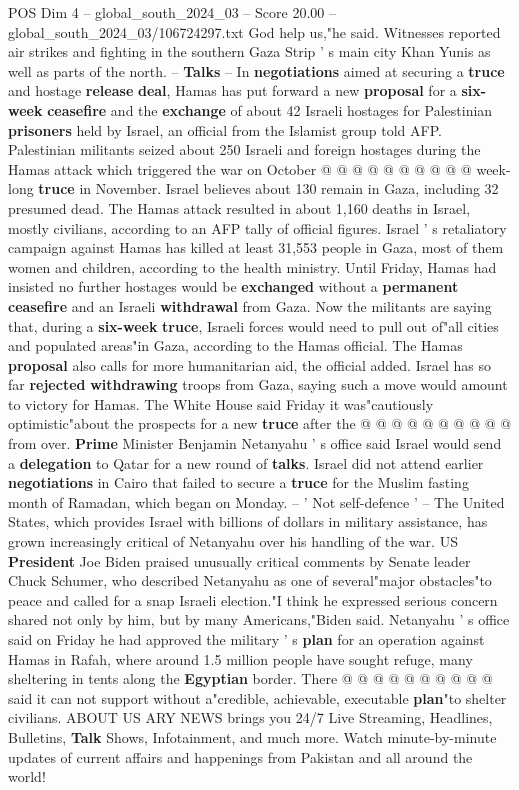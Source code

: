 \begin{textsample}{POS Dim 4 – global\_south\_2024\_03 – Score 20.00 – global\_south\_2024\_03/106724297.txt}
God help us,"he said.
Witnesses reported air strikes and fighting in the southern Gaza Strip ' s main city Khan Yunis as well as parts of the north. -- \textbf{Talks} -- In \textbf{negotiations} aimed at securing a \textbf{truce} and hostage \textbf{release} \textbf{deal}, Hamas has put forward a new \textbf{proposal} for a \textbf{six-week} \textbf{ceasefire} and the \textbf{exchange} of about 42 Israeli hostages for Palestinian \textbf{prisoners} held by Israel, an official from the Islamist group told AFP.
Palestinian militants seized about 250 Israeli and foreign hostages during the Hamas attack which triggered the war on October @ @ @ @ @ @ @ @ @ @ week-long \textbf{truce} in November.
Israel believes about 130 remain in Gaza, including 32 presumed dead.
The Hamas attack resulted in about 1,160 deaths in Israel, mostly civilians, according to an AFP tally of official figures.
Israel ' s retaliatory campaign against Hamas has killed at least 31,553 people in Gaza, most of them women and children, according to the health ministry.
Until Friday, Hamas had insisted no further hostages would be \textbf{exchanged} without a \textbf{permanent} \textbf{ceasefire} and an Israeli \textbf{withdrawal} from Gaza.
Now the militants are saying that, during a \textbf{six-week} \textbf{truce}, Israeli forces would need to pull out of"all cities and populated areas"in Gaza, according to the Hamas official.
The Hamas \textbf{proposal} also calls for more humanitarian aid, the official added.
Israel has so far \textbf{rejected} \textbf{withdrawing} troops from Gaza, saying such a move would amount to victory for Hamas.
The White House said Friday it was"cautiously optimistic"about the prospects for a new \textbf{truce} after the @ @ @ @ @ @ @ @ @ @ from over. \textbf{Prime} Minister Benjamin Netanyahu ' s office said Israel would send a \textbf{delegation} to Qatar for a new round of \textbf{talks}.
Israel did not attend earlier \textbf{negotiations} in Cairo that failed to secure a \textbf{truce} for the Muslim fasting month of Ramadan, which began on Monday. -- ' Not self-defence ' -- The United States, which provides Israel with billions of dollars in military assistance, has grown increasingly critical of Netanyahu over his handling of the war.
US \textbf{President} Joe Biden praised unusually critical comments by Senate leader Chuck Schumer, who described Netanyahu as one of several"major obstacles"to peace and called for a snap Israeli election."I think he expressed serious concern shared not only by him, but by many Americans,"Biden said.
Netanyahu ' s office said on Friday he had approved the military ' s \textbf{plan} for an operation against Hamas in Rafah, where around 1.5 million people have sought refuge, many sheltering in tents along the \textbf{Egyptian} border.
There @ @ @ @ @ @ @ @ @ @ said it can not support without a"credible, achievable, executable \textbf{plan}"to shelter civilians.
ABOUT US ARY NEWS brings you 24/7 Live Streaming, Headlines, Bulletins, \textbf{Talk} Shows, Infotainment, and much more.
Watch minute-by-minute updates of current affairs and happenings from Pakistan and all around the world!


\end{textsample}
